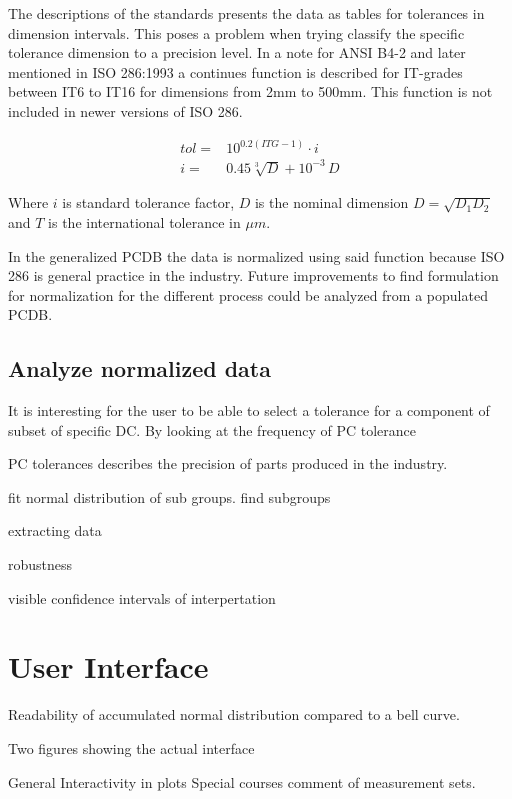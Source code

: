 \documentclass[aip,amsmath, reprint, author-year]{revtex4-1}
\begin{document}
The descriptions of the standards presents the data as tables for tolerances in dimension intervals. This poses a problem when trying classify the specific tolerance dimension to a precision level.
In a note for ANSI B4-2  and later mentioned in ISO 286:1993 a continues function is described for IT-grades between IT6 to IT16 for dimensions from 2mm to 500mm. This function is not included in newer versions of ISO 286.

\begin{align}
	tol =& 10^{0.2 (ITG -1)} \cdot i \\
	i =& 0.45 \sqrt[3]{D} + 10^{-3} \, D 
\end{align}

Where $i$ is standard tolerance factor, $D$ is the nominal dimension $D = \sqrt{D_1 D_2}$ and $T$ is the international tolerance in $\mu m$.

In the generalized PCDB the data is normalized using said function because ISO 286 is general practice in the industry. Future improvements to find formulation for normalization for the different process could be analyzed from a populated PCDB.

\subsection{Analyze normalized data}

It is interesting for the user to be able to select a tolerance for a component of subset of specific DC.
By looking at the frequency of PC tolerance 

PC tolerances describes the precision of parts produced in the industry. 



fit normal distribution of sub groups.
find subgroups

extracting data

robustness 



visible confidence intervals of interpertation


\section{User Interface}

Readability of accumulated normal distribution compared to a bell curve.

Two figures showing the actual interface

General
	Interactivity in plots 
		Special courses comment of measurement sets.
	
\end{document}
